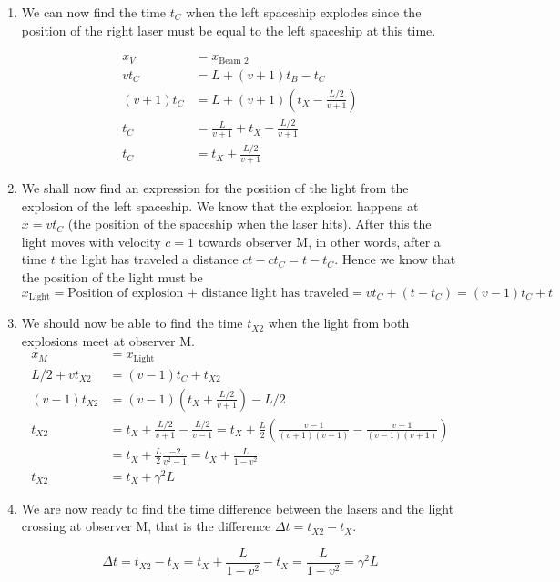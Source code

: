 \documentclass[a4paper,10pt,english]{article}
\begin{document}
\begin{enumerate}
\item We can now find the time $t_{C}$ when the left spaceship explodes since the position of the right laser must be equal to the left spaceship at this time.

\begin{align*}
x_{V}&=x_{\text{Beam 2}}\\
vt_{C}&=L+(v+1)t_{B}-t_{C}\\
(v+1)t_{C}&=L+(v+1)\left(t_{X}-\frac{L/2}{v+1}\right)\\
t_{C}&=\frac{L}{v+1}+t_{X}-\frac{L/2}{v+1}\\
t_{C}&=t_{X}+\frac{L/2}{v+1}
\end{align*}

\item We shall now find an expression for the position of the light from the explosion of the left spaceship. We know that the explosion happens at $x=vt_{C}$ (the position of the spaceship when the laser hits). After this the light moves with velocity $c=1$ towards observer M, in other words, after a time $t$ the light has traveled a distance $ct-ct_{C}=t-t_{C}$. Hence we know that the position of the light must be
\[x_{\text{Light}}=\text{Position of explosion + distance light has traveled}=vt_{C}+(t-t_{C})=(v-1)t_{C}+t\]

\item We should now be able to find the time $t_{X2}$ when the light from both explosions meet at observer M.
\begin{align*}
x_{M}&=x_{\text{Light}}\\
L/2+vt_{X2}&=(v-1)t_{C}+t_{X2}\\
(v-1)t_{X2}&=(v-1)\left(t_{X}+\frac{L/2}{v+1}\right)-L/2\\
t_{X2}&=t_{X}+\frac{L/2}{v+1}-\frac{L/2}{v-1}=t_{X}+\frac{L}{2}\left(\frac{v-1}{(v+1)(v-1)}-\frac{v+1}{(v-1)(v+1)}\right)\\
&=t_{X}+\frac{L}{2}\frac{-2}{v^{2}-1}=t_{X}+\frac{L}{1-v^{2}}\\
t_{X2}&=t_{X}+\gamma^{2}L
\end{align*}

\item We are now ready to find the time difference between the lasers and the light crossing at observer M, that is the difference $\Delta t=t_{X2}-t_{X}$.

\begin{equation*}
\Delta t=t_{X2}-t_{X}=t_{X}+\frac{L}{1-v^{2}}-t_{X}=\frac{L}{1-v^{2}}=\gamma^{2}L
\end{equation*}


\end{enumerate}
\end{document}
